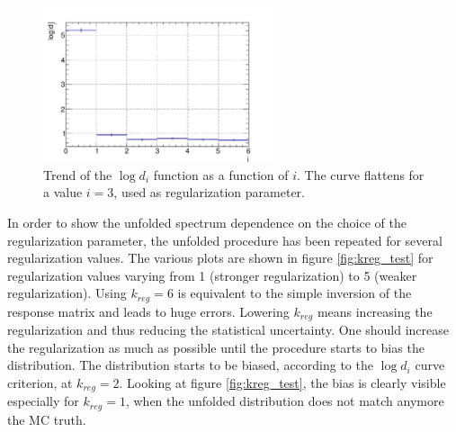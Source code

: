 \begin{figure}[htb]
\centering
\includegraphics[width=0.6\textwidth]{images/logdi_good.pdf}
\caption{Trend of the $\log{d_i}$ function as a function of $i$. The curve flattens for a value $i=3$, used as regularization parameter.}
\label{fig:log_di}
\end{figure}

In order to show the unfolded spectrum dependence on the choice of the regularization parameter, the unfolded procedure has been repeated for several regularization values. The various plots are shown in figure \ref{fig:kreg_test} for regularization values varying from 1 (stronger regularization) to 5 (weaker regularization). Using $k_{reg} = 6$ is equivalent to the simple inversion of the response matrix and leads to huge errors. Lowering $k_{reg}$ means increasing the regularization and thus reducing the statistical uncertainty. One should increase the regularization as much as possible until the procedure starts to bias the distribution. The distribution starts to be biased, according to the $\log{d_i}$ curve criterion, at $k_{reg} = 2$. Looking at figure \ref{fig:kreg_test}, the bias is clearly visible especially for $k_{reg} = 1$, when the unfolded distribution does not match anymore the MC truth.

